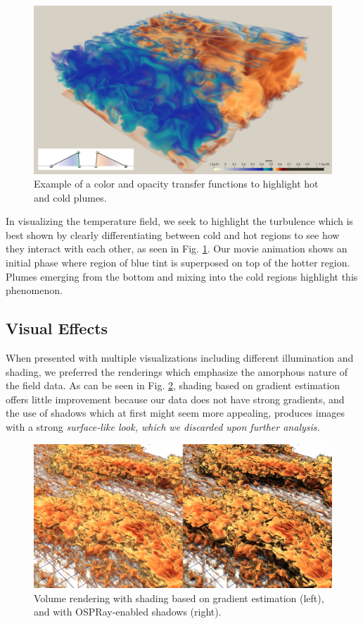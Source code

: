 \documentclass[5p,times]{elsarticle}
\begin{document}
\begin{figure}[!hbt]
	\centering
	\includegraphics[width=\linewidth]{zoom0000.pdf}%
	\caption{\label{fig:zoom} Example of a color and opacity transfer functions to highlight hot and cold plumes.}
\end{figure}


In visualizing the temperature field, we seek to highlight the turbulence which
is best shown by clearly differentiating between cold and hot regions to see how
they interact with each other, as seen in Fig. \ref{fig:zoom}. Our movie animation
shows an initial phase where region of blue tint is superposed on top of the hotter
region. Plumes emerging from the bottom and mixing into the cold regions highlight
this phenomenon.

\subsection{Visual Effects}

When presented with multiple visualizations including different illumination and
shading, we preferred the renderings which emphasize the
amorphous nature of the field data. As can be seen in Fig. \ref{fig:shadings},
shading based on gradient estimation offers little improvement because our data
does not have strong gradients, and the use of shadows which at first might seem
more appealing, produces images with a strong \it{surface-like} \rm look, which
we discarded upon further analysis.

\begin{figure}
	\centering
	\includegraphics[width=\linewidth]{fig2montage}%
	\caption{\label{fig:shadings} Volume rendering with shading based on gradient
estimation (left), and with OSPRay-enabled shadows (right).}
\end{figure}
\end{document}
